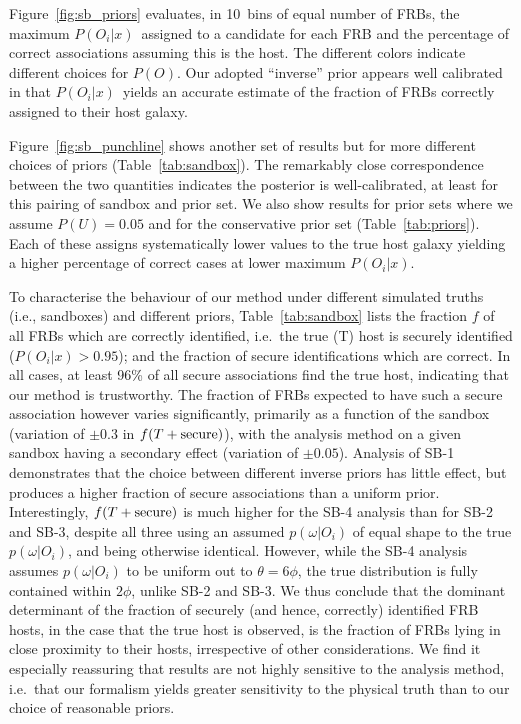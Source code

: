 \documentclass[twocolumn,linenumbers]{aastex63}
\newcommand{\mPO}{P(O)}  %
\newcommand{\PO}{$\mPO$}
\newcommand{\mPU}{P(U)}  %
\newcommand{\mPOix}{P(O_i|x)}  %
\newcommand{\POix}{$\mPOix$}
\begin{document}
Figure~\ref{fig:sb_priors} evaluates, in
10~bins of equal number of FRBs,
the maximum \POix\ assigned to a candidate
for each FRB and the percentage of correct
associations assuming this is the host.
The different colors indicate 
different choices for \PO.
Our adopted ``inverse'' prior appears well calibrated
in that \POix\ yields an accurate estimate of the
fraction of FRBs correctly assigned to their host galaxy.

Figure~\ref{fig:sb_punchline} shows another set of
results but for more different choices of priors 
(Table~\ref{tab:sandbox}).
The remarkably close correspondence between the
two quantities indicates the posterior is well-calibrated,
at least for this pairing of sandbox and prior set.
We also show results for prior sets where we 
assume $\mPU = 0.05$ and for the conservative prior set
(Table~\ref{tab:priors}).
Each of these assigns systematically lower values 
to the true host galaxy yielding a higher 
percentage of correct cases at lower maximum \POix.

To characterise the behaviour of our method under different
simulated truths (i.e., sandboxes) and different priors, Table~\ref{tab:sandbox} lists
the fraction $f$ of all FRBs which are correctly identified, i.e.\ the true (T) host is securely identified
($\mPOix > 0.95$); and the fraction of secure identifications which are correct. In all cases, at least 96\% of all secure
associations find the true host, indicating that our
method is trustworthy.
The fraction of FRBs expected to have such a secure association however varies significantly, primarily as a function of the sandbox (variation of $\pm 0.3$ in $f(T+{\rm secure})$), with the analysis method on a given sandbox having a secondary effect (variation of $\pm 0.05$). Analysis of SB-1 demonstrates that the choice between different inverse priors has little effect, but produces a higher fraction of secure associations than a uniform prior. Interestingly, $f(T+{\rm secure})$ is much higher for the SB-4 analysis than for SB-2 and SB-3, despite all three using an assumed $p(\omega|O_i)$ of equal shape to the true $p(\omega|O_i)$, and being otherwise identical. However, while the SB-4 analysis assumes $p(\omega|O_i)$ to be uniform out to $\theta=6 \phi$, the true distribution is fully contained within $2 \phi$, unlike SB-2 and SB-3. We thus conclude that the dominant determinant of the fraction of securely (and hence, correctly) identified FRB hosts, in the case that the true host is observed, is the fraction of FRBs lying in close proximity to their hosts, irrespective of other considerations. We find it especially reassuring that results are not highly sensitive to the analysis method, i.e.\ that our formalism yields greater sensitivity to the physical truth than to our choice of reasonable priors.
\end{document}
